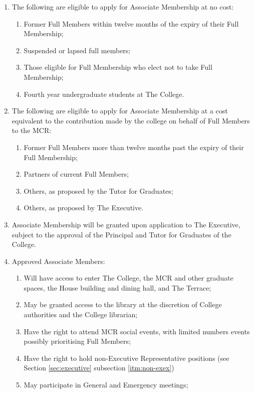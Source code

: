 \documentclass[11pt, a4paper]{article}
\begin{document}
\begin{enumerate}
    \item The following are eligible to apply for Associate Membership at no cost:
    \begin{enumerate}
        \item Former Full Members within twelve months of the expiry of their Full Membership;
        \item Suspended or lapsed full members;
        \item Those eligible for Full Membership who elect not to take Full Membership;
        \item Fourth year undergraduate students at The College.
    \end{enumerate}
    \item The following are eligible to apply for Associate Membership at a cost equivalent to the contribution made by the college on behalf of Full Members to the MCR:
    \begin{enumerate}
        \item Former Full Members more than twelve months past the expiry of their Full Membership;
        \item Partners of current Full Members;
        \item Others, as proposed by the Tutor for Graduates;
        \item Others, as proposed by The Executive.
    \end{enumerate}
    \item Associate Membership will be granted upon application to The Executive, subject to the approval of the Principal and Tutor for Graduates of the College.
    \item Approved Associate Members:
    \begin{enumerate}
        \item Will have access to enter The College, the MCR and other graduate spaces, the House building and dining hall, and The Terrace;
        \item May be granted access to the library at the discretion of College authorities and the College librarian;
        \item Have the right to attend MCR social events, with limited numbers events possibly prioritising Full Members;
        \item Have the right to hold non-Executive Representative positions (see Section \ref{sec:executive} subsection \ref{itm:non-exex})
        \item May participate in General and Emergency meetings;

\end{enumerate}
\end{enumerate}
\end{document}
